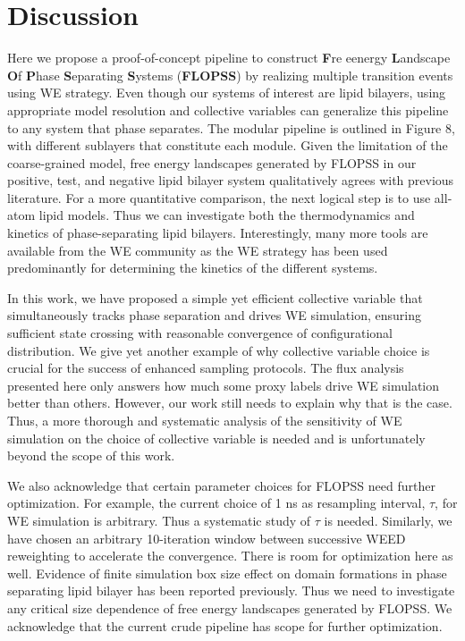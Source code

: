 \documentclass{biophys-new}
\begin{document}
\section*{Discussion}

Here we propose a proof-of-concept pipeline to construct \textbf{F}re eenergy \textbf{L}andscape \textbf{O}f \textbf{P}hase \textbf{S}eparating \textbf{S}ystems (\textbf{FLOPSS}) by realizing multiple transition events using WE strategy.
Even though our systems of interest are lipid bilayers, using appropriate model resolution and collective variables can generalize this pipeline to any system that phase separates.
The modular pipeline is outlined in Figure 8, with different sublayers that constitute each module.
Given the limitation of the coarse-grained model, free energy landscapes generated by FLOPSS in our positive, test, and negative lipid bilayer system qualitatively agrees with previous literature.
For a more quantitative comparison, the next logical step is to use all-atom lipid models.
Thus we can investigate both the thermodynamics and kinetics of phase-separating lipid bilayers.
Interestingly, many more tools are available from the WE community as the WE strategy has been used predominantly for determining the kinetics of the different systems.

In this work, we have proposed a simple yet efficient collective variable that simultaneously tracks phase separation and drives WE simulation, ensuring sufficient state crossing with reasonable convergence of configurational distribution. 
We give yet another example of why collective variable choice is crucial for the success of enhanced sampling protocols. 
The flux analysis presented here only answers how much some proxy labels drive WE simulation better than others.
However, our work still needs to explain why that is the case.
Thus, a more thorough and systematic analysis of the sensitivity of WE simulation on the choice of collective variable is needed and is unfortunately beyond the scope of this work.

We also acknowledge that certain parameter choices for FLOPSS need further optimization.
For example, the current choice of 1 ns as resampling interval, $\tau$, for WE simulation is arbitrary.
Thus a systematic study of $\tau$ is needed.
Similarly, we have chosen an arbitrary 10-iteration window between successive WEED reweighting to accelerate the convergence.  
There is room for optimization here as well.
Evidence of finite simulation box size effect on domain formations in phase separating lipid bilayer has been reported previously\cite{Pantelopulos2017}.
Thus we need to investigate any critical size dependence of free energy landscapes generated by FLOPSS.
We acknowledge that the current crude pipeline has scope for further optimization. 
\end{document}
